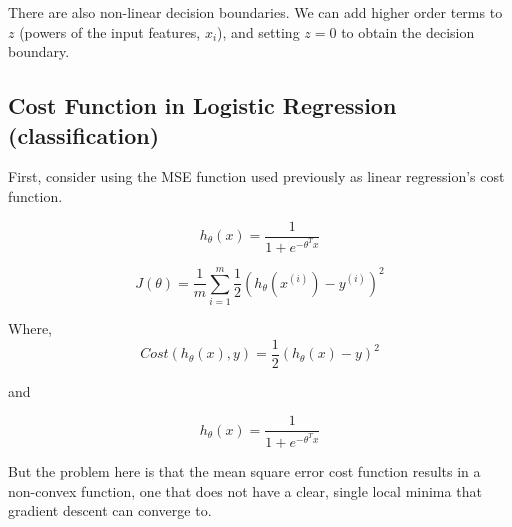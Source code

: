 \documentclass{article}
\begin{document}
There are also non-linear decision boundaries. We can add higher order terms to $z$ (powers of the input features, $x_i$), and setting $z = 0$ to obtain the decision boundary.


\subsection{Cost Function in Logistic Regression (classification)}

\begin{myboxr}
First, consider using the MSE function used previously as linear regression's cost function.

\begin{equation}
    h_{\theta} (x) = \frac{1}{1+e^{-\theta^T x}}
\end{equation}



\begin{equation}
    J(\theta) = \frac{1}{m} \sum_{i=1}^{m} \frac{1}{2} \left(h_{\theta} (x^{(i)}) - y^{(i)}\right)^2
\end{equation}


Where,
\begin{equation}
    Cost(h_{\theta} (x), y) = \frac{1}{2} \left( h_{\theta} (x) - y \right)^2
\end{equation}

and

\begin{equation}
    h_{\theta} (x) = \frac{1}{1 + e^{-\theta^T x}}
\end{equation}


But the problem here is that the mean square error cost function results in a non-convex function, one that does not have a clear, single local minima that gradient descent can converge to. 

\end{myboxr}
\end{document}
